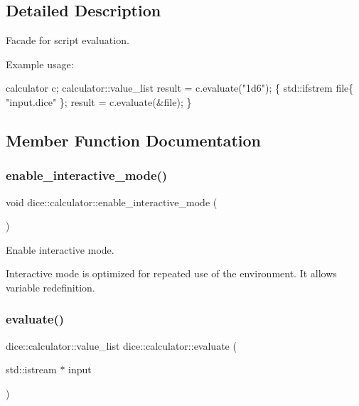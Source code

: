 \subsection{Detailed Description}
Facade for script evaluation. 

Example usage\+: 
\begin{DoxyCode}
calculator c;
calculator::value\_list result = c.evaluate(\textcolor{stringliteral}{"1d6"});
\{
     std::ifstrem file\{ \textcolor{stringliteral}{"input.dice"} \};
     result = c.evaluate(&file);
\}
\end{DoxyCode}
 

\subsection{Member Function Documentation}
\mbox{\label{structdice_1_1calculator_a6fe7689c86d8df71f7f312dbd7defdcf}} 
\subsubsection{\texorpdfstring{enable\+\_\+interactive\+\_\+mode()}{enable\_interactive\_mode()}}
{\footnotesize\ttfamily void dice\+::calculator\+::enable\+\_\+interactive\+\_\+mode (\begin{DoxyParamCaption}{ }\end{DoxyParamCaption})}



Enable interactive mode. 

Interactive mode is optimized for repeated use of the environment. It allows variable redefinition. \mbox{\label{structdice_1_1calculator_a63547bad8045470c9849124502036052}} 
\subsubsection{\texorpdfstring{evaluate()}{evaluate()}\hspace{0.1cm}{\footnotesize\ttfamily [1/2]}}
{\footnotesize\ttfamily dice\+::calculator\+::value\+\_\+list dice\+::calculator\+::evaluate (\begin{DoxyParamCaption}\item[{std\+::istream $\ast$}]{input }\end{DoxyParamCaption})}



